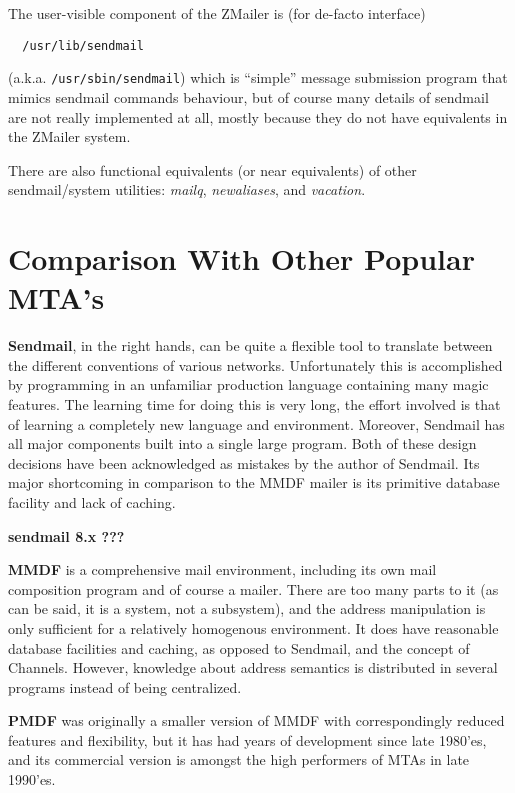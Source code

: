 The user-visible component of the ZMailer is (for de-facto interface)
\begin{verbatim}
  /usr/lib/sendmail
\end{verbatim}
(a.k.a. {\tt /usr/sbin/sendmail})
which is ``simple'' message submission program that mimics sendmail
commands behaviour, but of course many details of sendmail are
not really implemented at all, mostly because they do not have
equivalents in the ZMailer system.

There are also functional equivalents (or near equivalents) of
other sendmail/system utilities:
{\em mailq}, {\em newaliases}, and {\em vacation}.



\section{Comparison With Other Popular MTA's}

{\bf Sendmail}, in the right hands, can be quite a flexible tool to translate
between the different conventions of various networks.  Unfortunately this
is accomplished by programming in an unfamiliar production language
containing many magic features.  The learning time for doing this is very
long, the effort involved is that of learning a completely new language and
environment. Moreover, Sendmail has all major components built into a
single large program. Both of these design decisions have been acknowledged
as mistakes by the author of Sendmail.  Its major shortcoming in comparison
to the MMDF mailer is its primitive database facility and lack of caching.

{\bf sendmail 8.x ???}


{\bf MMDF} is a comprehensive mail environment, including its own mail
composition program and of course a mailer.  There are too many parts to it
(as can be said, it is a system, not a subsystem), and the address
manipulation is only sufficient for a relatively homogenous environment. It
does have reasonable database facilities and caching, as opposed to
Sendmail, and the concept of Channels.  However, knowledge about address
semantics is distributed in several programs instead of being centralized.

{\bf PMDF} was originally a smaller version of MMDF with correspondingly
reduced features and flexibility, but it has had years of development
since late 1980'es, and its commercial version is amongst the high
performers of MTAs in late 1990'es.

